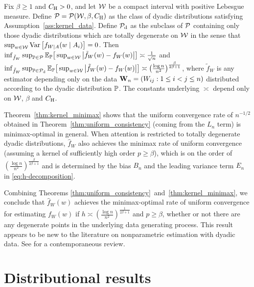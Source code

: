 \begin{theorem} \label{thm:kernel_minimax}

  Fix $\beta \geq 1$ and $C_\rH > 0$,
  and let $\cW$ be a compact interval with positive Lebesgue measure.
  Define $\cP = \cP(\cW, \beta, C_\rH)$
  as the class of dyadic distributions
  satisfying Assumption~\ref{ass:kernel_data}.
  Define $\cP_\rd$ as the subclass of $\cP$
  containing only those dyadic distributions
  which are totally degenerate on $\cW$ in the sense that
  $\sup_{w \in \cW} \Var\left[f_{W \mid A}(w \mid A_i)\right] = 0$.
  Then
  $\inf_{\tilde f_W} \sup_{\P \in \cP}
  \E_\P\big[\sup_{w \in \cW} \big| \tilde f_W(w) - f_W(w) \big| \big]
  \asymp \frac{1}{\sqrt n}$
  and
  $\inf_{\tilde f_W} \sup_{\P \in \cP_\rd}
  \E_\P\big[\sup_{w \in \cW} \big| \tilde f_W(w) - f_W(w) \big| \big]
  \asymp \big( \frac{\log n}{n^2} \big)^{\frac{\beta}{2\beta+1}}$,
  where $\tilde f_W$ is any estimator depending only on
  the data $\bW_n = (W_{i j}: 1 \leq i < j \leq n)$
  distributed according to the dyadic distribution $\P$.
  The constants underlying $\asymp$ depend only on
  $\cW$, $\beta$ and $C_\rH$.

\end{theorem}

Theorem~\ref{thm:kernel_minimax} shows that the uniform convergence rate of
$n^{-1/2}$
obtained in Theorem~\ref{thm:uniform_consistency}
(coming from the $L_n$ term) is minimax-optimal in general.
When attention is restricted to totally degenerate dyadic distributions,
$\hat f_W$ also achieves the minimax rate of uniform convergence
(assuming a kernel of sufficiently high order $p \geq \beta$),
which is on the order of
$\left(\frac{\log n}{n^2}\right)^{\frac{\beta}{2\beta+1}}$ and
is determined by the bias $B_n$ and the leading variance term $E_n$ in
\eqref{eq:h-decomposition}.

Combining Theorems \ref{thm:uniform_consistency}~and~\ref{thm:kernel_minimax},
we
conclude that $\hat{f}_W(w)$ achieves the minimax-optimal rate
of uniform convergence for estimating $f_W(w)$ if
$h \asymp \left( \frac{\log n}{n^2} \right)^{\frac{1}{2\beta+1}}$
and $p \geq \beta$,
whether or not there are
any degenerate points in the underlying data generating process.
This result appears to be new to the literature on
nonparametric estimation with dyadic data.
See \citet{gao2021minimax} for a contemporaneous review.

\section{Distributional results}\label{sec:kernel_inference}

